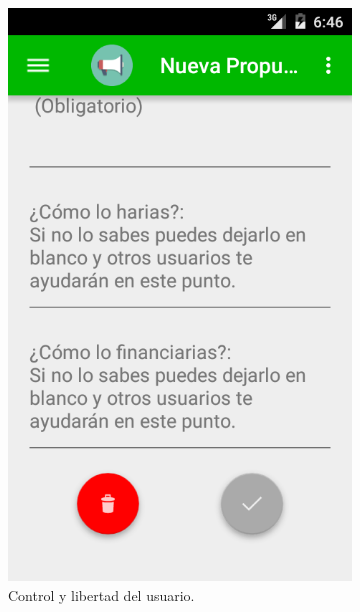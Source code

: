 \begin{figure}[H]
\begin{subfigure}[b]{0.3\textwidth}
                \includegraphics[width=\textwidth]{Media/Captures/principio03.png}
                \caption{Control y libertad del usuario.}
                \label{fig:designPrinciplesControl}
        \end{subfigure}
        ~
        \begin{subfigure}[b]{0.3\textwidth}

\end{subfigure}
\end{figure}
